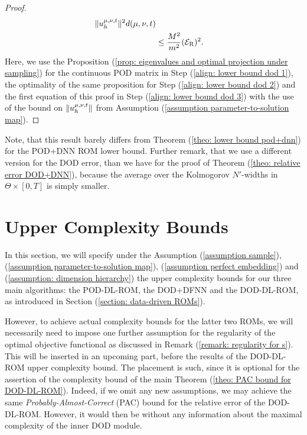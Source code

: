 \begin{proof}
\begin{align}
        \lVert u_h^{\mu, \nu, t} \rVert^2 d(\mu, \nu, t) \\
        &\leq \frac{M^2}{m^2} (\mathcal{E}_\text{R})^2. \label{align: lower bound dod 3}
    \end{align}
    Here, we use the Proposition (\ref{prop: eigenvalues and optimal projection under sampling}) for the
    continuous POD matrix in Step (\ref{align: lower bound dod 1}), the optimality of the same proposition 
    for Step (\ref{align: lower bound dod 2}) and the first equation of this proof in 
    Step (\ref{align: lower bound dod 3}) with the use of the bound on $\lVert u_h^{\mu, \nu, t} \rVert$ from Assumption
    (\ref{assumption parameter-to-solution map}). 
\end{proof}

Note, that this result barely differs from Theorem (\ref{theo: lower bound pod+dnn}) for the POD+DNN
ROM lower bound. Further remark, that we use a different version for the DOD error, than we have for the proof of Theorem
(\ref{theo: relative error DOD+DNN}), because the average over the Kolmogorov $N'$-widths in $\Theta \times [0, T]$ 
is simply smaller.




\section{Upper Complexity Bounds} \label{section: upper complexity bounds}





In this section, we will specify under the Assumption (\ref{assumption sample}), (\ref{assumption parameter-to-solution map}),
(\ref{assumption perfect embedding}) and (\ref{assumption: dimension hierarchy}) the upper complexity bounds for
our three main algorithms: the POD-DL-ROM, the DOD+DFNN and the DOD-DL-ROM, as introduced in
Section (\ref{section: data-driven ROMs}). 

However, to achieve actual complexity
bounds for the latter two ROMs, we will necessarily need to impose one further assumption for the regularity of the 
optimal objective
functional as discussed in Remark (\ref{remark: regularity for s}). 
This will be inserted in an upcoming part, before the results of the DOD-DL-ROM upper complexity bound. The
placement is such, since
it is optional for the assertion of the complexity bound of the main Theorem (\ref{theo: PAC bound for DOD-DL-ROM}).
Indeed, if we omit any new assumptions, we may achieve the same \emph{Probably-Almost-Correct} (PAC) bound for the 
relative error of the DOD-DL-ROM. However, it would then be 
without any information about the maximal complexity of the inner DOD module.



